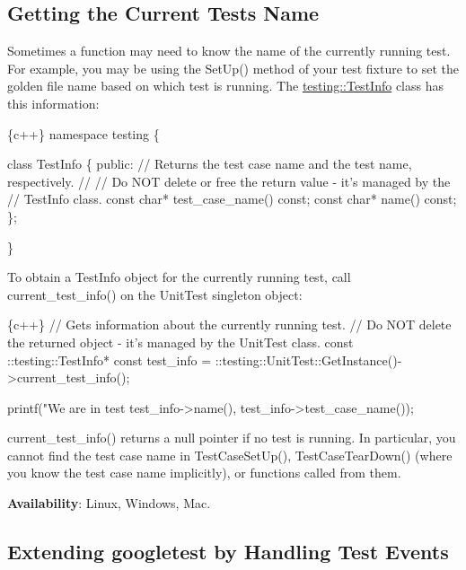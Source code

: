 \subsection*{Getting the Current Test\textquotesingle{}s Name}

Sometimes a function may need to know the name of the currently running test. For example, you may be using the {\ttfamily Set\+Up()} method of your test fixture to set the golden file name based on which test is running. The {\ttfamily \hyperlink{classtesting_1_1TestInfo}{testing\+::\+Test\+Info}} class has this information\+:


\begin{DoxyCode}
\{c++\}
namespace testing \{

class TestInfo \{
 public:
  // Returns the test case name and the test name, respectively.
  //
  // Do NOT delete or free the return value - it's managed by the
  // TestInfo class.
  const char* test\_case\_name() const;
  const char* name() const;
\};

\}
\end{DoxyCode}


To obtain a {\ttfamily Test\+Info} object for the currently running test, call {\ttfamily current\+\_\+test\+\_\+info()} on the {\ttfamily Unit\+Test} singleton object\+:


\begin{DoxyCode}
\{c++\}
  // Gets information about the currently running test.
  // Do NOT delete the returned object - it's managed by the UnitTest class.
  const ::testing::TestInfo* const test\_info =
    ::testing::UnitTest::GetInstance()->current\_test\_info();



  printf("We are in test %
         test\_info->name(),
         test\_info->test\_case\_name());
\end{DoxyCode}


{\ttfamily current\+\_\+test\+\_\+info()} returns a null pointer if no test is running. In particular, you cannot find the test case name in {\ttfamily Test\+Case\+Set\+Up()}, {\ttfamily Test\+Case\+Tear\+Down()} (where you know the test case name implicitly), or functions called from them.

{\bfseries Availability}\+: Linux, Windows, Mac.

\subsection*{Extending googletest by Handling Test Events}


